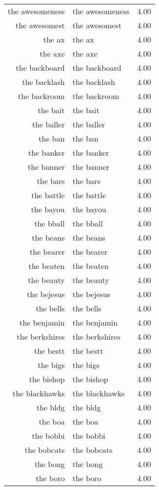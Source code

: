 \begin{table}[ht]
\begin{tabular}{rlr}
  the awesomeness & the awesomeness & 4.00 \\ 
  the awesomest & the awesomest & 4.00 \\ 
  the ax & the ax & 4.00 \\ 
  the axe & the axe & 4.00 \\ 
  the backboard & the backboard & 4.00 \\ 
  the backlash & the backlash & 4.00 \\ 
  the backroom & the backroom & 4.00 \\ 
  the bait & the bait & 4.00 \\ 
  the baller & the baller & 4.00 \\ 
  the ban & the ban & 4.00 \\ 
  the banker & the banker & 4.00 \\ 
  the banner & the banner & 4.00 \\ 
  the bars & the bars & 4.00 \\ 
  the battle & the battle & 4.00 \\ 
  the bayou & the bayou & 4.00 \\ 
  the bball & the bball & 4.00 \\ 
  the beans & the beans & 4.00 \\ 
  the bearer & the bearer & 4.00 \\ 
  the beaten & the beaten & 4.00 \\ 
  the beauty & the beauty & 4.00 \\ 
  the bejesus & the bejesus & 4.00 \\ 
  the bells & the bells & 4.00 \\ 
  the benjamin & the benjamin & 4.00 \\ 
  the berkshires & the berkshires & 4.00 \\ 
  the bestt & the bestt & 4.00 \\ 
  the bigs & the bigs & 4.00 \\ 
  the bishop & the bishop & 4.00 \\ 
  the blackhawks & the blackhawks & 4.00 \\ 
  the bldg & the bldg & 4.00 \\ 
  the boa & the boa & 4.00 \\ 
  the bobbi & the bobbi & 4.00 \\ 
  the bobcats & the bobcats & 4.00 \\ 
  the bong & the bong & 4.00 \\ 
  the boro & the boro & 4.00 \\ 

\end{tabular}
\end{table}
